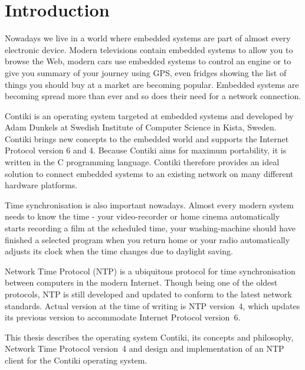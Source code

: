 
\chapter{Introduction}
Nowadays we live in a world where embedded systems are part of almost every electronic device.
Modern televisions contain embedded systems to allow you to browse the Web,
modern cars use embedded systems to control an engine or to give you summary
of your journey using GPS, even fridges showing the list of things you should buy at a market are becoming popular.
Embedded systems are becoming spread more than ever and so does
their need for a network connection.

Contiki is an operating system targeted at embedded systems and
developed by Adam Dunkels at Swedish Institute of Computer Science in Kista, Sweden.
Contiki brings new concepts to the embedded world and supports the Internet Protocol version 6 and 4.
Because Contiki aims for maximum portability, it is written in the C programming language.
Contiki therefore provides an ideal solution to connect
embedded systems to an existing network on many different hardware platforms.

Time synchronisation is also important nowadays.
Almost every modern system needs to know the time -
your video-recorder or home cinema automatically starts recording a film at the scheduled time,
your washing-machine should have finished a selected program when you return home
or your radio automatically adjusts its clock when the time changes
due to daylight saving.

Network Time Protocol (NTP) is a ubiquitous protocol for time synchronisation between computers in the modern Internet.
Though being one of the oldest protocols, NTP is still developed and updated to conform to the latest
network standards. Actual version at the time of writing is NTP version~4, which updates its previous version to
accommodate Internet Protocol version~6.

This thesis describes the operating system Contiki, its concepts and philosophy,
Network Time Protocol version~4 and design and implementation of an NTP client for the Contiki operating system.










